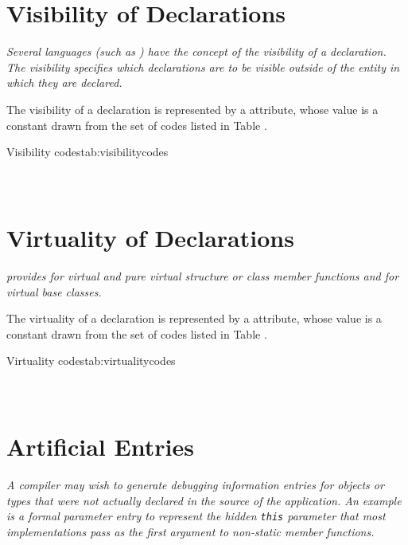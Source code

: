 \section{Visibility of Declarations}
\label{chap:visibilityofdeclarations}

\textit{Several languages (such as ) 
have the concept of the visibility of a declaration. The
visibility specifies which declarations are to be 
visible outside of the entity in which they are
declared.}

The 
\hypertarget{chap:DWATvisibilityvisibilityofdeclaration}{}
visibility of a declaration is represented 
by a \DWATvisibility{}
attribute, whose value is a
constant drawn from the set of codes listed in 
Table .

\begin{simplenametable}[1.5in]{Visibility codes}{tab:visibilitycodes}
\DWVISlocalTARG{}          \\
\DWVISexportedTARG{}    \\
\DWVISqualifiedTARG{}  \\
\end{simplenametable}

\section{Virtuality of Declarations}
\label{chap:virtualityofdeclarations}
\textit{ provides for virtual and pure virtual structure or class
member functions and for virtual base classes.}

The 
\hypertarget{chap:DWATvirtualityvirtualityindication}{}
virtuality of a declaration is represented by a
\DWATvirtuality{}
attribute, whose value is a constant drawn
from the set of codes listed in 
Table .

\begin{simplenametable}[2.5in]{Virtuality codes}{tab:virtualitycodes}
\DWVIRTUALITYnoneTARG{}                      \\
\DWVIRTUALITYvirtualTARG{}                \\
\DWVIRTUALITYpurevirtualTARG{}    \\
\end{simplenametable}

\section{Artificial Entries}
\label{chap:artificialentries}
\textit{A compiler may wish to generate debugging information entries
for objects or types that were not actually declared in the
source of the application. An example is a formal parameter
entry to represent the hidden 
\texttt{this} parameter
that most  implementations pass as the first argument 
to non-static member functions.}  

